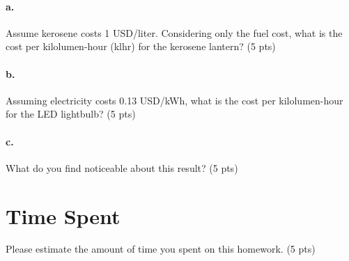 \documentclass{article}
\newif\ifsolution
\newcommand{\solution}[1]
{\ifsolution
\vspace{10pt}
{\color{answer-color} #1}
\else\fi}
\begin{document}
\paragraph{a.} Assume kerosene costs 1 USD/liter.  Considering only the fuel cost,
what is the cost per kilolumen-hour (klhr) for the kerosene lantern? (5 pts)

\solution{
The light output, lumens, and the fuel use are both rates.  We need to
multiply these by a unit of time to get the unit of light energy,
kilolumen-hours.  This should be reminiscent of multiplying the power by
time to get energy.
$$ \ufrac{30 ml/hour}{40 lumens} \cdot
   \ufrac{hour}{hour}
   = 0.75 \ufrac{ml}{lumen-hour}$$
$$ \ufrac{0.75 ml}{lumen-hour} \cdot
\ufrac{1000 lumen-hour}{klhr} \cdot
\ufrac{1 USD}{1000 ml} = 0.75 USD/klhr$$
}

\paragraph{b.} Assuming electricity costs 0.13 USD/kWh, what is the cost per
kilolumen-hour for the LED lightbulb? (5 pts)

\solution{
$$ \ufrac{10 watts}{900 lumens} \cdot
   \ufrac{hour}{hour} \cdot
   \ufrac{1 kWh}{1000 Wh} \cdot
   \ufrac{0.13 USD}{kWh} \cdot
   \ufrac{1000 lumen-hour}{klhr}
   = 0.0014 USD/klhr$$
}
\paragraph{c.} What do you find noticeable about this result? (5 pts)

\solution{
We see that per unit of light, kerosene light is over 500 times more
expensive (based on the fuel cost) than the electricity used to power an
LED lightbulb.
}


\section{Time Spent}

Please estimate the amount of time you spent on this homework. (5 pts)
\end{document}
